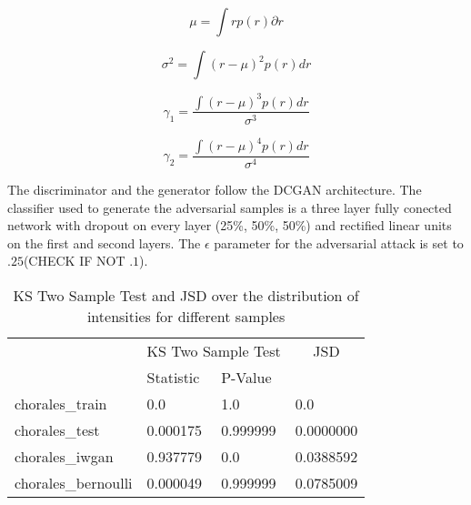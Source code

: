 
\begin{equation}
    \mu = \int rp(r) \partial r
\end{equation}

\begin{equation}
    \sigma^2 = \int (r - \mu)^2 p(r) dr
\end{equation}

\begin{equation}
    \gamma_1 = \frac{\int (r - \mu)^3 p(r) dr}{\sigma^3}
\end{equation}

\begin{equation}
    \gamma_2 = \frac{\int (r - \mu)^4 p(r) dr}{\sigma^4}
\end{equation}

The discriminator and the generator follow the DCGAN architecture.
The classifier used to generate the adversarial samples is a three layer fully
conected network with dropout on every layer (25\%, 50\%, 50\%) and rectified
linear units on the first and second layers. The $\epsilon$ parameter for the
adversarial attack is set to $.25$(CHECK IF NOT $.1$).

\begin{table}[!h]
\centering
\label{tbl:mnist_pixel}
\begin{tabular}{l|ll|l|}
                   & \multicolumn{2}{c|}{\cellcolor[HTML]{C0C0C0}KS Two Sample Test} & \multicolumn{1}{c|}{\cellcolor[HTML]{C0C0C0}JSD} \\
                      & Statistic   & P-Value        &                \\
chorales\_train       & 0.0         & 1.0            & 0.0            \\
chorales\_test        & 0.000175    & 0.999999       & 0.0000000      \\
chorales\_iwgan       & 0.937779    & 0.0            & 0.0388592      \\
chorales\_bernoulli   & 0.000049    & 0.999999       & 0.0785009      
\end{tabular}
\caption{KS Two Sample Test and JSD over the distribution of intensities for
different samples}
\end{table}
